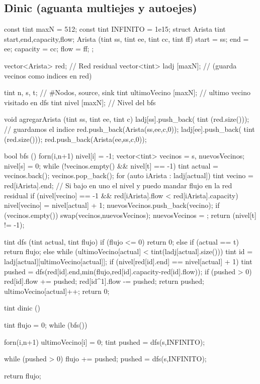 \subsection{Dinic (aguanta multiejes y autoejes)}
\begin{code}
const tint maxN = 512;
const tint INFINITO = 1e15;
struct Arista {
	tint start,end,capacity,flow;
	Arista (tint ss, tint ee, tint cc, tint ff) {
		start = ss;
		end = ee;
		capacity = cc;
		flow = ff;
	}
};

vector<Arista>  red; // Red residual
vector<tint> ladj [maxN]; // (guarda vecinos como indices en red)

tint n, s, t; // #Nodos, source, sink
tint ultimoVecino [maxN]; // ultimo vecino visitado en dfs
tint nivel [maxN]; // Nivel del bfs

void agregarArista (tint ss, tint ee, tint c) {
	ladj[ss].push_back( tint (red.size())); // guardamos el indice
	red.push_back(Arista(ss,ee,c,0));
	ladj[ee].push_back( tint (red.size()));
	red.push_back(Arista(ee,ss,c,0));
}

bool bfs () {
	forn(i,n+1)
		nivel[i] = -1;
	vector<tint> vecinos = {s}, nuevosVecinos;
	nivel[s] = 0;
	while (!vecinos.empty() && nivel[t] == -1) {
		tint actual = vecinos.back();
		vecinos.pop_back();
		for (auto iArista : ladj[actual]) {
			tint vecino = red[iArista].end;
			// Si bajo en uno el nivel y puedo mandar flujo en la red residual
			if (nivel[vecino] == -1 && red[iArista].flow < red[iArista].capacity) {
				nivel[vecino] = nivel[actual] + 1;
				nuevosVecinos.push_back(vecino);
			}
		}
		if (vecinos.empty()) {
			swap(vecinos,nuevosVecinos);
			nuevosVecinos = {};
		}
	}
	return (nivel[t] != -1);
}

tint dfs (tint actual, tint flujo) {
	if (flujo <= 0)
		return 0;
	else if (actual == t)
		return flujo;
	else {
		while (ultimoVecino[actual] < tint(ladj[actual].size())) {
			tint id = ladj[actual][ultimoVecino[actual]];
			if (nivel[red[id].end] == nivel[actual] + 1) {
				tint pushed = dfs(red[id].end,min(flujo,red[id].capacity-red[id].flow));
				if (pushed > 0) {
					red[id].flow += pushed;
					red[id^1].flow -= pushed;
					return pushed;
				}
			}
			ultimoVecino[actual]++;
		}
		return 0;	
	}
}

tint dinic () {
	tint flujo = 0;
	while (bfs()) {
		forn(i,n+1)
			ultimoVecino[i] = 0;
		tint pushed = dfs(s,INFINITO);
		
		while (pushed > 0) {
			flujo += pushed;
			pushed = dfs(s,INFINITO);
		}
	}
	return flujo;
}
\end{code}

